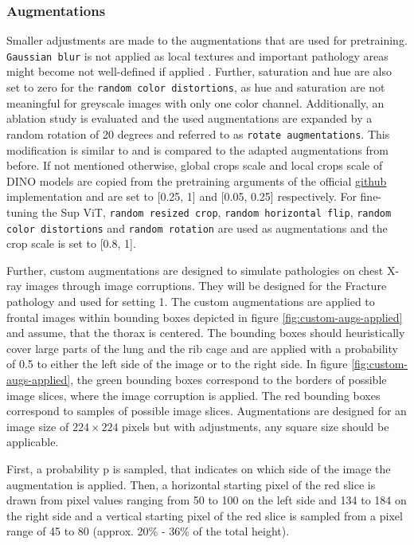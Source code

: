 \subsubsection{Augmentations}
Smaller adjustments are made to the augmentations that are used for pretraining.
\texttt{Gaussian blur} is not applied as local textures and important pathology areas might become not well-defined if applied \citep{Azizi2021}.
Further, saturation and hue are also set to zero for the \texttt{random color distortions}, as hue and saturation are not meaningful for greyscale images with only one color channel.
Additionally, an ablation study is evaluated and the used augmentations are expanded by a random rotation of 20 degrees and referred to as \texttt{rotate augmentations}. 
This modification is similar to \citep{Azizi2021} and is compared to the adapted augmentations from before.
If not mentioned otherwise, global crops scale and local crops scale of DINO models are copied from the pretraining arguments of the official \href{https://github.com/facebookresearch/dino#pretrained-models}{github} implementation and are set to [0.25, 1] and [0.05, 0.25] respectively. 
For fine-tuning the Sup ViT, \texttt{random resized crop}, \texttt{random horizontal flip}, \texttt{random color distortions} and \texttt{random rotation} are used as augmentations and the crop scale is set to [0.8, 1].
\par
Further, custom augmentations are designed to simulate pathologies on chest X-ray images through image corruptions.
They will be designed for the Fracture pathology and used for setting 1.
The custom augmentations are applied to frontal images within bounding boxes depicted in figure \ref{fig:custom-augs-applied} and assume, that the thorax is centered.
The bounding boxes should heuristically cover large parts of the lung and the rib cage and are applied with a probability of 0.5 to either the left side of the image or to the right side.
In figure \ref{fig:custom-augs-applied}, the green bounding boxes correspond to the borders of possible image slices, where the image corruption is applied.
The red bounding boxes correspond to samples of possible image slices.
Augmentations are designed for an image size of $224\times224$ pixels but with adjustments, any square size should be applicable.
\par
First, a probability p is sampled, that indicates on which side of the image the augmentation is applied.
Then, a horizontal starting pixel of the red slice is drawn from pixel values ranging from 50 to 100 on the left side and 134 to 184 on the right side and a vertical starting pixel of the red slice is sampled from a pixel range of 45 to 80 (approx. 20\% - 36\% of the total height).
